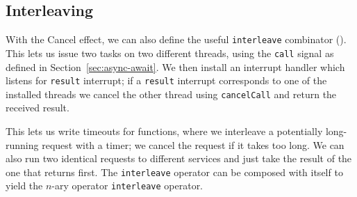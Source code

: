 \documentclass[msc,deptreport,cs]{infthesis} %
\newcommand{\code}[1]{\lstinline{#1}}
\newcommand{\greytext}[1]{\textcolor{black!40}{#1}}
\newcommand{\todo}[1]
           {{\par\noindent\small\color{RoyalPurple}
  \framebox{\parbox{\dimexpr\linewidth-2\fboxsep-2\fboxrule}
    {\textbf{TODO:} #1}}}}
\begin{document}
\subsection{Interleaving}

With the \textsf{Cancel} effect, we can also define the useful \code{interleave}
combinator (\cite{leijen2017structured}).
%
This lets us issue two tasks on two different threads, using the \code{call}
signal as defined in Section~\ref{sec:async-await}. We then install an interrupt
handler which listens for \code{result} interrupt; if a \code{result} interrupt
corresponds to one of the installed threads we cancel the other thread using
\code{cancelCall} and return the received result.








This lets us write timeouts for functions, where we interleave a potentially
long-running request with a timer; we cancel the request if it takes too long.
We can also run two identical requests to different services and just take the
result of the one that returns first. The \code{interleave} operator can be
composed with itself to yield the $n$-ary operator \code{interleave} operator.
\end{document}
